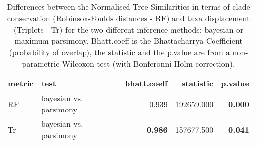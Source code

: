 \begin{table}[ht]
\centering
\begin{tabular}{llr|rr}
  \hline
metric & test & bhatt.coeff & statistic & p.value \\ 
  \hline
RF & bayesian vs. parsimony & 0.939 & 192659.000 & \textbf{0.000} \\ 
  Tr & bayesian vs. parsimony & \textbf{0.986} & 157677.500 & \textbf{0.041} \\ 
   \hline
\end{tabular}
\caption{Differences between the Normalised Tree Similarities in terms of clade conservation (Robinson-Foulds distances - RF) and taxa displacement (Triplets - Tr) for the two different inference methods: bayesian or maximum parsimony. Bhatt.coeff is the Bhattacharrya Coefficient (probability of overlap), the statistic and the p.value are from a non-parametric Wilcoxon test (with Bonferonni-Holm correction).} 
\label{Tab_pooledsmethods_test}
\end{table}
